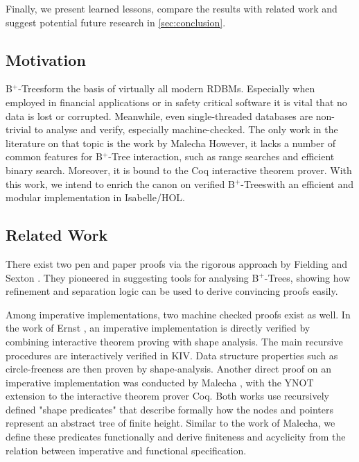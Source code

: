 \documentclass[a4paper,UKenglish,cleveref, autoref, thm-restate]{lipics-v2021}
\newcommand{\btree}{B$^+$-Tree}
\newcommand{\btrees}{B$^+$-Trees}
\begin{document}
Finally, we present learned lessons, compare the results with related work and suggest potential future
research in \autoref{sec:conclusion}.


\subsection{Motivation}
\label{sec:motivation}

\btrees form the basis of virtually all modern RDBMs.
Especially when employed in financial applications
or in safety critical software it is vital that
no data is lost or corrupted.
Meanwhile, even single-threaded databases
are non-trivial to analyse and verify,
especially machine-checked.
The only work in the literature on that topic
is the work by Malecha %
However, it lacks a number of common features for \btree
interaction, such as range searches and efficient binary search.
Moreover, it is bound to the Coq interactive theorem prover.
With this work, we intend to enrich the canon on verified
\btrees with an efficient and modular implementation
in Isabelle/HOL.


\subsection{Related Work}
\label{sec:related_work}

There exist two pen and paper proofs via the rigorous approach
by Fielding \cite{Fielding80} and Sexton \cite{DBLP:journals/entcs/SextonT08}.
They pioneered in suggesting tools for analysing \btrees,
showing how refinement and separation logic can be used to
derive convincing proofs easily.

Among imperative implementations, two machine checked proofs exist as well.
In the work of Ernst \cite{DBLP:journals/sosym/ErnstSR15},
an imperative implementation is directly verified
by combining interactive theorem proving
with shape analysis.
The main recursive procedures are interactively verified in KIV.
Data structure properties such as circle-freeness are then proven by shape-analysis.
Another direct proof on an imperative implementation
was conducted by Malecha \cite{DBLP:conf/popl/MalechaMSW10}, with the YNOT
extension to the interactive theorem prover Coq.
Both works use recursively defined "shape predicates"
that describe formally how the nodes and pointers
represent an abstract tree of finite height.
Similar to the work of Malecha, we define these predicates functionally
and derive finiteness and acyclicity from the relation between imperative and functional specification.
\end{document}
